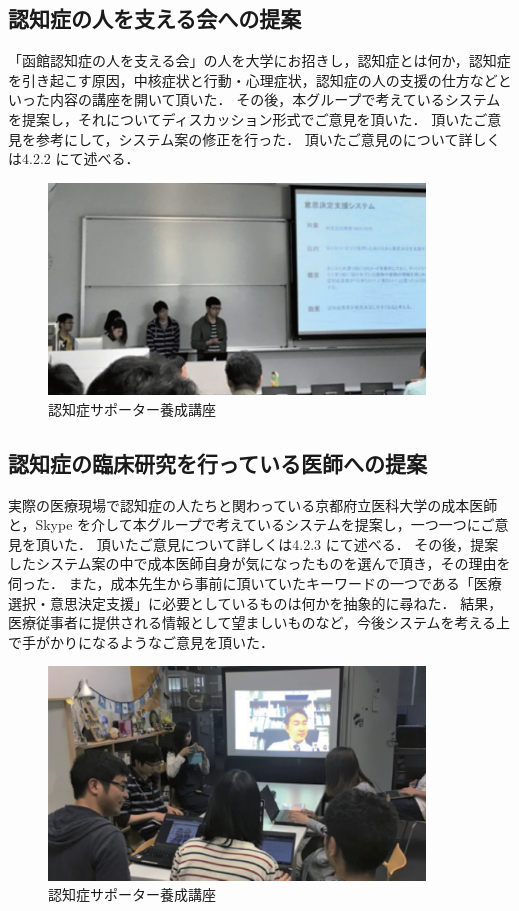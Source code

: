 \documentclass[../report]{subfiles}
\begin{document}
\subsection{認知症の人を支える会への提案}
「函館認知症の人を支える会」の人を大学にお招きし，認知症とは何か，認知症を引き起こす原因，中核症状と行動・心理症状，認知症の人の支援の仕方などといった内容の講座を開いて頂いた．
その後，本グループで考えているシステムを提案し，それについてディスカッション形式でご意見を頂いた．
頂いたご意見を参考にして，システム案の修正を行った．
頂いたご意見のについて詳しくは4.2.2 にて述べる．
\begin{figure}[htbp]
    \begin{center}
        \includegraphics[width=10cm]{imgs/2_idea_review1.png}
        \caption{認知症サポーター養成講座}
    \end{center}
\end{figure}

\subsection{認知症の臨床研究を行っている医師への提案}
実際の医療現場で認知症の人たちと関わっている京都府立医科大学の成本医師と，Skype を介して本グループで考えているシステムを提案し，一つ一つにご意見を頂いた．
頂いたご意見について詳しくは4.2.3 にて述べる．
その後，提案したシステム案の中で成本医師自身が気になったものを選んで頂き，その理由を伺った．
また，成本先生から事前に頂いていたキーワードの一つである「医療選択・意思決定支援」に必要としているものは何かを抽象的に尋ねた．
結果，医療従事者に提供される情報として望ましいものなど，今後システムを考える上で手がかりになるようなご意見を頂いた．
\begin{figure}[htbp]
    \begin{center}
        \includegraphics[width=10cm]{imgs/2_idea_review2.png}
        \caption{認知症サポーター養成講座}
    \end{center}
\end{figure}
\end{document}
